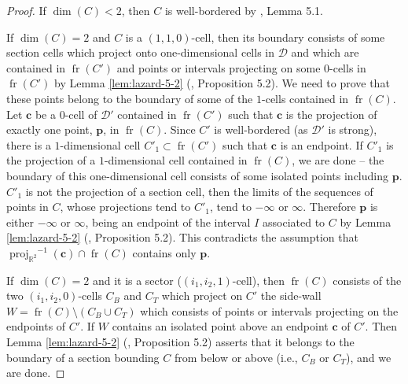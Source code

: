 \documentclass[
]{book}
\theoremstyle{definition}
\theoremstyle{definition}
\theoremstyle{definition}
\theoremstyle{definition}
\theoremstyle{remark}
\begin{document}
\begin{proof}
If \(\dim(C) < 2\), then \(C\) is well-bordered by \citet{lazard10}, Lemma 5.1.

If \(\dim(C) = 2\) and \(C\) is a \((1,1,0)\)-cell, then its boundary consists of some section cells which project onto one-dimensional cells in \(\mathcal{D}\) and which are contained in \({\operatorname{fr} \left( C' \right)}\) and points or intervals projecting on some \(0\)-cells in \({\operatorname{fr} \left( C' \right)}\) by Lemma \ref{lem:lazard-5-2} (\citet{lazard10}, Proposition 5.2).
We need to prove that these points belong to the boundary of some of the \(1\)-cells contained in \({\operatorname{fr} \left( C \right)}\).
Let \(\mathbf{c}\) be a \(0\)-cell of \(\mathcal{D'}\) contained in \({\operatorname{fr} \left( C' \right)}\) such that \(\mathbf{c}\) is the projection of exactly one point, \(\mathbf{p}\), in \({\operatorname{fr} \left( C \right)}\).
Since \(C'\) is well-bordered (as \(\mathcal{D'}\) is strong), there is a \(1\)-dimensional cell \(C'_1 \subset {\operatorname{fr} \left( C' \right)}\) such that \(\mathbf{c}\) is an endpoint.
If \(C'_1\) is the projection of a \(1\)-dimensional cell contained in \({\operatorname{fr} \left( C \right)}\), we are done -- the boundary of this one-dimensional cell consists of some isolated points including \(\mathbf{p}\).
\(C'_1\) is not the projection of a section cell, then the limits of the sequences of points in \(C\), whose projections tend to \(C'_1\), tend to \(-\infty\) or \(\infty\). Therefore \(\mathbf{p}\) is either \(-\infty\) or \(\infty\), being an endpoint of the interval \(I\) associated to \(C\) by Lemma \ref{lem:lazard-5-2} (\citet{lazard10}, Proposition 5.2). This contradicts the assumption that \({\operatorname{proj}_{\mathbb{R}^{2}}}^{-1}(\mathbf{c}) \cap {\operatorname{fr} \left( C \right)}\) contains only \(\mathbf{p}\).

If \(\dim(C) = 2\) and it is a sector (\((i_1,i_2,1)\)-cell), then \({\operatorname{fr} \left( C \right)}\) consists of the two \((i_1,i_2,0)\)-cells \(C_B\) and \(C_T\) which project on \(C'\) the side-wall \(W = {\operatorname{fr} \left( C \right)} \setminus (C_B \cup C_T)\) which consists of points or intervals projecting on the endpoints of \(C'\).
If \(W\) contains an isolated point above an endpoint \(\mathbf{c}\) of \(C'\). Then Lemma \ref{lem:lazard-5-2} (\citet{lazard10}, Proposition 5.2) asserts that it belongs to the boundary of a section bounding \(C\) from below or above (i.e., \(C_B\) or \(C_T\)), and we are done.


\end{proof}
\end{document}
